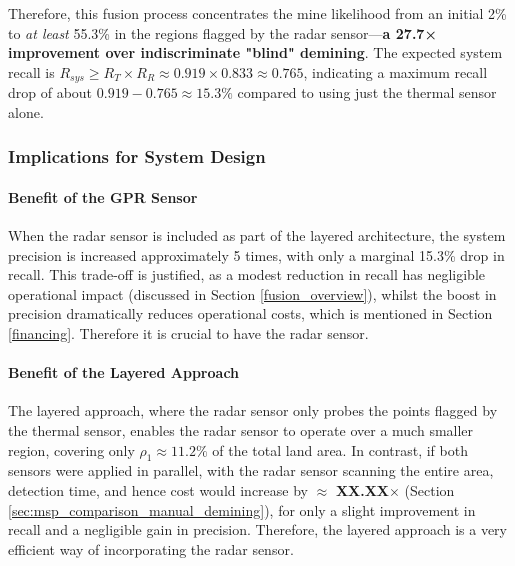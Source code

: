         Therefore, this fusion process concentrates the mine likelihood from an initial 2\% to \textit{at least} 55.3\% in the regions flagged by the radar sensor—\textbf{a  27.7× improvement over indiscriminate "blind" demining}. The expected system recall is $R_{sys} \geq R_T \times R_R \approx 0.919 \times 0.833 \approx 0.765$, indicating a maximum recall drop of about $0.919 - 0.765 \approx 15.3\%$ compared to using just the thermal sensor alone.


    \subsubsection{Implications for System Design}

        \paragraph{Benefit of the GPR Sensor}
        
            
            When the radar sensor is included as part of the layered architecture, the system precision is increased approximately 5 times, with only a marginal 15.3\% drop in recall. This trade-off is justified, as a modest reduction in recall has negligible operational impact (discussed in Section \ref{fusion_overview}), whilst the boost in precision dramatically reduces operational costs, which is mentioned in Section \ref{financing}. Therefore it is crucial to have the radar sensor.
                
        \paragraph{Benefit of the Layered Approach}
        
            The layered approach, where the radar sensor only probes the points flagged by the thermal sensor, enables the radar sensor to operate over a much smaller region, covering only $\rho_1 \approx 11.2\%$ of the total land area. In contrast, if both sensors were applied in parallel, with the radar sensor scanning the entire area, detection time, and hence cost would increase by $\approx$ \textbf{XX.XX}$\times$ (Section \ref{sec:msp_comparison_manual_demining}), for only a slight improvement in recall and a negligible gain in precision. Therefore, the layered approach is a very efficient way of incorporating the radar sensor. 

            

        